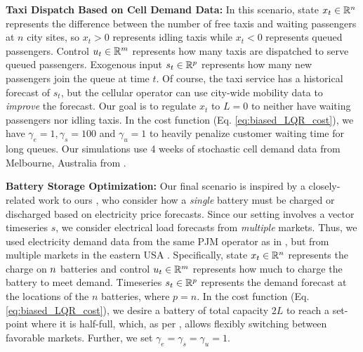 \textbf{Taxi Dispatch Based on Cell Demand Data: }
In this scenario, state $x_t \in \mathbb{R}^{n}$ represents the difference between the number of free taxis and waiting passengers at $n$ city sites, so $x_t > 0$ represents idling taxis while $x_t < 0$ represents queued passengers. Control $u_t \in \mathbb{R}^{m}$ represents how many taxis are dispatched to serve queued passengers. Exogenous input $s_t \in \mathbb{R}^{p}$ represents how many new passengers join the queue at time $t$. Of course, the taxi service has a historical forecast of $s_t$, but the cellular operator can use city-wide mobility data to \textit{improve} the forecast. 
Our goal is to regulate $x_t$ to $L=0$ to neither have waiting passengers nor idling taxis. In the cost function (Eq. \ref{eq:biased_LQR_cost}), we have $\gamma_e = 1, \gamma_s = 100$ and $\gamma_u = 1$ to heavily penalize customer waiting time for long queues. Our simulations use 4 weeks of stochastic cell demand data from Melbourne, Australia from \cite{chinchali2018cellular}.

\textbf{Battery Storage Optimization: }
Our final scenario is inspired by a closely-related work to ours \cite{donti2017task}, who consider how a \textit{single} battery must be charged or discharged based on electricity price forecasts. Since our setting involves a vector timeseries $s$, we consider electrical load forecasts from \textit{multiple} markets. Thus, we used electricity demand data from the same PJM operator as in \cite{donti2017task}, but from multiple markets in the eastern USA \cite{PJM}. Specifically, state $x_t \in \mathbb{R}^{n}$ represents the charge on $n$ batteries and control $u_t \in \mathbb{R}^{m}$ represents how much to charge the battery to meet demand. Timeseries $s_t \in \mathbb{R}^{p}$ represents the demand forecast at the locations of the $n$ batteries, where $p=n$. 
In the cost function (Eq. \ref{eq:biased_LQR_cost}), we desire a battery of total capacity $2L$ to reach a set-point where it is half-full, which, as per \cite{donti2017task}, allows flexibly switching between favorable markets. Further, we set $\gamma_e = \gamma_s = \gamma_u = 1$. 

